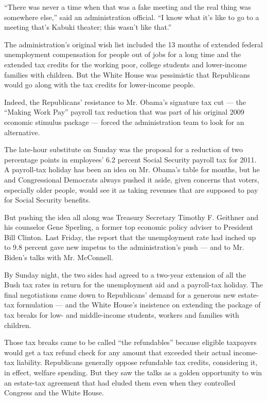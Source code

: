 ``There was never a time when that was a fake meeting and the real thing
was somewhere else,'' said an administration official. ``I know what
it's like to go to a meeting that's Kabuki theater; this wasn't like
that.''

The administration's original wish list included the 13 months of
extended federal unemployment compensation for people out of jobs for a
long time and the extended tax credits for the working poor, college
students and lower-income families with children. But the White House
was pessimistic that Republicans would go along with the tax credits for
lower-income people.

Indeed, the Republicans' resistance to Mr. Obama's signature tax cut ---
the ``Making Work Pay'' payroll tax reduction that was part of his
original 2009 economic stimulus package --- forced the administration
team to look for an alternative.

The late-hour substitute on Sunday was the proposal for a reduction of
two percentage points in employees' 6.2 percent Social Security payroll
tax for 2011. A payroll-tax holiday has been an idea on Mr. Obama's
table for months, but he and Congressional Democrats always pushed it
aside, given concerns that voters, especially older people, would see it
as taking revenues that are supposed to pay for Social Security
benefits.

But pushing the idea all along was Treasury Secretary Timothy F.
Geithner and his counselor Gene Sperling, a former top economic policy
adviser to President Bill Clinton. Last Friday, the report that the
unemployment rate had inched up to 9.8 percent gave new impetus to the
administration's push --- and to Mr. Biden's talks with Mr. McConnell.

By Sunday night, the two sides had agreed to a two-year extension of all
the Bush tax rates in return for the unemployment aid and a payroll-tax
holiday. The final negotiations came down to Republicans' demand for a
generous new estate-tax formulation --- and the White House's insistence
on extending the package of tax breaks for low- and middle-income
students, workers and families with children.

Those tax breaks came to be called ``the refundables'' because eligible
taxpayers would get a tax refund check for any amount that exceeded
their actual income-tax liability. Republicans generally oppose
refundable tax credits, considering it, in effect, welfare spending. But
they saw the talks as a golden opportunity to win an estate-tax
agreement that had eluded them even when they controlled Congress and
the White House.

